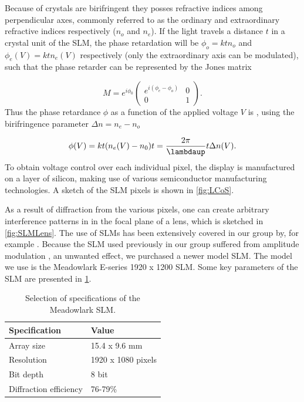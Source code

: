 Because of crystals are birifringent they posses refractive indices among perpendicular axes, commonly referred to as the ordinary and extraordinary refractive indices respectively ($n_o$ and $n_e$). 
If the light travels a distance $t$ in a crystal unit of the SLM, the phase retardation will be $\phi_o = k t n_o$ and $\phi_e(V) = k t n_e(V)$ respectively (only the extraordinary axis can be modulated), such that the phase retarder can be represented by the Jones matrix \cite{Guzman2017}

\begin{equation}\label{eq:JonesMatrix}
    M = e^{i \phi_0} 
    \begin{pmatrix}
        e^{i(\phi_e-\phi_o)} & 0\\
        0 & 1
    \end{pmatrix}.
\end{equation}
Thus the phase retardance $\phi$ as a function of the applied voltage $V$ is \cite{Guzman2017}, using the birifringence parameter $\Delta n= n_e-n_o$

\begin{equation}\label{eq:ElectroOpticResponse}
    \phi(V) = k t(n_e(V) - n_0) t = \frac{2\pi}{\lambdaup}t \Delta n(V).
\end{equation}
To obtain voltage control over each individual pixel, the display is manufactured on a layer of silicon, making use of various semiconductor manufacturing technologies.
A sketch of the SLM pixels is shown in \cref{fig:LCoS}. 

As a result of diffraction from the various pixels, one can create arbitrary interference patterns in in the focal plane of a lens, which is sketched in \cref{fig:SLMLens}.
The use of SLMs has been extensively covered in our group by, for example \cite{Dijk2012,Bijnen2013,Bijnen2015}. 
Because the SLM used previously in our group suffered from amplitude modulation \cite{Dijk2012,Bijnen2015}, an unwanted effect, we purchased a newer model SLM. 
The model we use is the Meadowlark E-series 1920 x 1200 SLM.
Some key parameters of the SLM are presented in \cref{table:SLMspecs}.

\begin{table}[h]
    \centering
    \caption{Selection of specifications of the Meadowlark SLM.}
    \label{table:SLMspecs}
    \begin{tabular}{l | l}
        \textbf{Specification}          & \textbf{Value}        \\ \hline 
        Array size                      & 15.4 x 9.6 mm         \\ \hline
        Resolution                      & 1920 x 1080 pixels    \\ \hline
        Bit depth                       & 8 bit                 \\ \hline
        Diffraction efficiency          & 76-79\%   
    \end{tabular}
\end{table}

